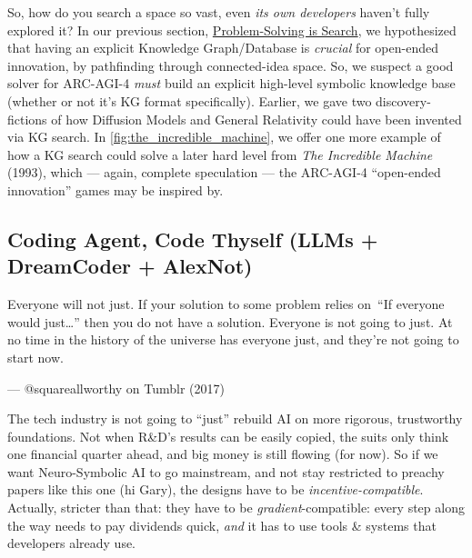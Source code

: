 \documentclass[11pt]{article}
\renewenvironment{quote}
  {\begin{tcolorbox}[enhanced, breakable, sharp corners, frame hidden,
     colback=quotebg, borderline west={3pt}{0pt}{quotebar},
     left=8pt, right=8pt, top=5pt, bottom=5pt,
     before upper={\setlength{\parskip}{0.6em}}]}
  {\end{tcolorbox}}
\begin{document}
So, how do you search a space so vast, even \textit{its own developers} haven't fully explored it? In our previous section, \hyperref[sec:search]{Problem-Solving is Search}, we hypothesized that having an explicit Knowledge Graph/Database is \textit{crucial} for open-ended innovation, by pathfinding through connected-idea space. So, we suspect a good solver for ARC-AGI-4 \textit{must} build an explicit high-level symbolic knowledge base (whether or not it's KG format specifically). Earlier, we gave two discovery-fictions of how Diffusion Models and General Relativity could have been invented via KG search. In \autoref{fig:the_incredible_machine}, we offer one more example of how a KG search could solve a later hard level from \textit{The Incredible Machine} (1993), which — again, complete speculation — the ARC-AGI-4 ``open-ended innovation'' games may be inspired by.

\subsection{Coding Agent, Code Thyself (LLMs + DreamCoder + AlexNot)}
\begin{quote}
Everyone will not just. If your solution to some problem relies on “If everyone would just…” then you do not have a solution. Everyone is not going to just. At no time in the history of the universe has everyone just, and they’re not going to start now.

— @squareallworthy on Tumblr (2017)    
\end{quote}
The tech industry is not going to ``just'' rebuild AI on more rigorous, trustworthy foundations. Not when R\&D's results can be easily copied, the suits only think one financial quarter ahead, and big money is still flowing (for now). So if we want Neuro-Symbolic AI to go mainstream, and not stay restricted to preachy papers like this one (hi Gary), the designs have to be \textit{incentive-compatible}. Actually, stricter than that: they have to be \textit{gradient}-compatible: every step along the way needs to pay dividends quick, \textit{and} it has to use tools \& systems that developers already use. 
\end{document}
